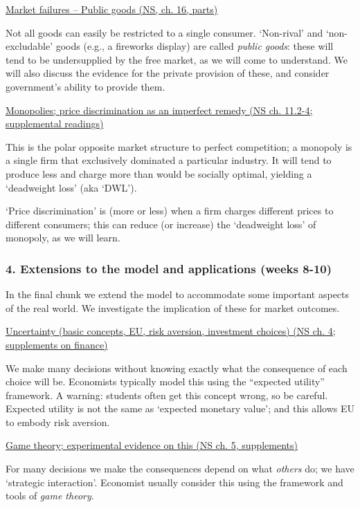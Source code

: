 \documentclass[]{article}
\begin{document}
\underline{Market failures -- Public goods (NS, ch. 16, parts)}

Not all goods can easily be restricted to a single consumer. `Non-rival'
and `non-excludable' goods (e.g., a fireworks display) are called
\emph{public goods}: these will tend to be undersupplied by the free
market, as we will come to understand. We will also discuss the evidence
for the private provision of these, and consider government's ability to
provide them.

\underline{Monopolies; price discrimination as an imperfect remedy (NS ch. 11.2-4; supplemental readings)}

This is the polar opposite market structure to perfect competition; a
monopoly is a single firm that exclusively dominated a particular
industry. It will tend to produce less and charge more than would be
socially optimal, yielding a `deadweight loss' (aka `DWL').

`Price discrimination' is (more or less) when a firm charges different
prices to different consumers; this can reduce (or increase) the
`deadweight loss' of monopoly, as we will learn.

\hypertarget{extensions-to-the-model-and-applications-weeks-8-10}{%
\subsubsection{4. Extensions to the model and applications (weeks
8-10)}\label{extensions-to-the-model-and-applications-weeks-8-10}}

In the final chunk we extend the model to accommodate some important
aspects of the real world. We investigate the implication of these for
market outcomes.

\underline{Uncertainty (basic concepts, EU, risk aversion, investment choices) (NS ch. 4; supplements on finance)}

We make many decisions without knowing exactly what the consequence of
each choice will be. Economists typically model this using the
``expected utility'' framework. A warning: students often get this
concept wrong, so be careful. Expected utility is not the same as
`expected monetary value'; and this allows EU to embody risk aversion.

\underline{Game theory; experimental evidence on this (NS ch. 5, supplements)}

For many decisions we make the consequences depend on what \emph{others}
do; we have `strategic interaction'. Economist usually consider this
using the framework and tools of \emph{game theory}.
\end{document}
